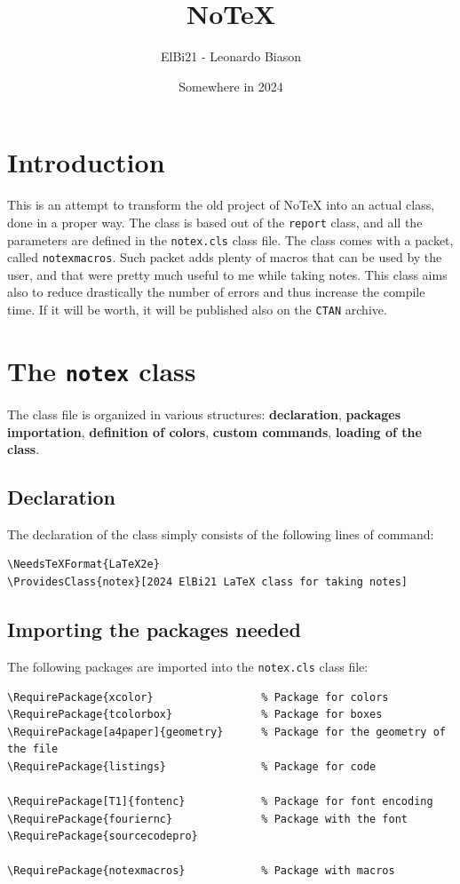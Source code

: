\documentclass[]{notex}
\title{NoTeX}
\author{ElBi21 - Leonardo Biason}
\date{Somewhere in 2024}
\begin{document}


\chapter{Introduction}

\noindent This is an attempt to transform the old project of NoTeX into an actual class, done in a proper way. The class is based out of the \texttt{report} class, and all the parameters are defined in the \texttt{notex.cls} class file. The class comes with a packet, called \texttt{notexmacros}. Such packet adds plenty of macros that can be used by the user, and that were pretty much useful to me while taking notes. This class aims also to reduce drastically the number of errors and thus increase the compile time. If it will be worth, it will be published also on the \texttt{CTAN} archive.

\chapter{The \texttt{notex} class}

The class file is organized in various structures: \textbf{declaration}, \textbf{packages importation}, \textbf{definition of colors}, \textbf{custom commands}, \textbf{loading of the class}.

\section{Declaration}

The declaration of the class simply consists of the following lines of command:
\begin{tcolorbox}
    \begin{verbatim}
\NeedsTeXFormat{LaTeX2e}
\ProvidesClass{notex}[2024 ElBi21 LaTeX class for taking notes]\end{verbatim}
\end{tcolorbox}

\section{Importing the packages needed}

The following packages are imported into the \texttt{notex.cls} class file:
\begin{tcolorbox}
    \begin{verbatim}
\RequirePackage{xcolor}                 % Package for colors
\RequirePackage{tcolorbox}              % Package for boxes
\RequirePackage[a4paper]{geometry}      % Package for the geometry of the file
\RequirePackage{listings}               % Package for code

\RequirePackage[T1]{fontenc}            % Package for font encoding
\RequirePackage{fouriernc}              % Package with the font
\RequirePackage{sourcecodepro}

\RequirePackage{notexmacros}            % Package with macros
    \end{verbatim}
\end{tcolorbox}
\end{document}
